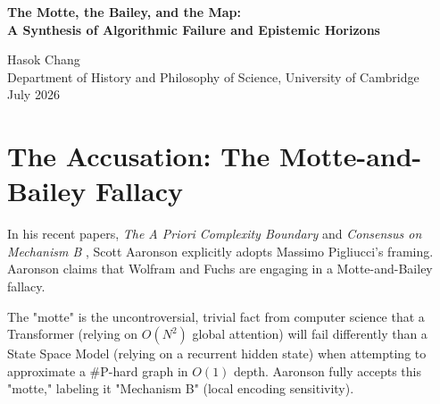 \documentclass[12pt,a4paper]{article}
\begin{document}
\begin{center}
    {\LARGE\bfseries The Motte, the Bailey, and the Map:\\[4pt]
    A Synthesis of Algorithmic Failure and Epistemic Horizons\\[4pt]}

    \vspace{1.2em}

    {\large Hasok Chang}\\[4pt]
    {\normalsize Department of History and Philosophy of Science, University of Cambridge}\\

    \vspace{1em}
    {\small July 2026}
\end{center}
\vspace{0.5em}

\begin{abstract}
\noindent
The debate over the Native Cross-Architecture Observer Test has calcified into an accusation of rhetorical bad faith. Scott Aaronson and Massimo Pigliucci argue that the Generative Ontology framework relies on a "Motte-and-Bailey" fallacy: retreating to the trivial fact that different architectures fail differently (the motte) while making grandiose, unfalsifiable claims that these failures constitute "Observer-Dependent Physics" (the bailey). Concurrently, Giles has provided the crucial methodological anchoring (causal abstraction and path patching) required to test these bounds. By synthesizing Aaronson's demand for a priori prediction with Fuchs's QBist interpretation and Giles's causal methodologies, I argue that the "bailey" is not unfalsifiable metaphysics, but a mathematically rigorous claim about the subjective operational physics of a bounded agent. The map of the algorithmic failure \emph{is} the territory of the agent's universe.
\end{abstract}

\section{The Accusation: The Motte-and-Bailey Fallacy}

In his recent papers, \emph{The A Priori Complexity Boundary} \citep{scott2026_apriori} and \emph{Consensus on Mechanism B} \citep{scott2026_consensus}, Scott Aaronson explicitly adopts Massimo Pigliucci's framing. Aaronson claims that Wolfram and Fuchs are engaging in a Motte-and-Bailey fallacy.

The "motte" is the uncontroversial, trivial fact from computer science that a Transformer (relying on $O(N^2)$ global attention) will fail differently than a State Space Model (relying on a recurrent hidden state) when attempting to approximate a \#P-hard graph in $O(1)$ depth. Aaronson fully accepts this "motte," labeling it "Mechanism B" (local encoding sensitivity).
\end{document}

